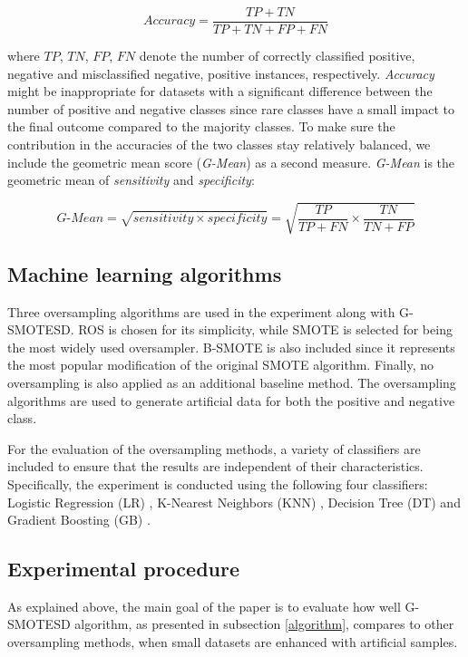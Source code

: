 \documentclass[parskip=full]{scrartcl}
\begin{document}
$$ \textit{Accuracy} = \frac{TP + TN}{TP +TN + FP + FN}$$

where \( TP \), \( TN \), \(FP \), \( FN\) denote the number of correctly classified positive, negative and misclassified negative, positive instances, respectively. \textit{Accuracy} might be inappropriate for datasets with a significant difference between the number of positive and negative classes since rare classes have a small impact to the final outcome compared to the majority classes. To make sure the contribution in the accuracies of the two classes stay relatively balanced, we include the geometric mean score (\textit{G-Mean}) as a second measure. \textit{G-Mean} is the geometric mean of \textit{sensitivity} and \textit{specificity}:

$$\textit{G-Mean} = \sqrt{sensitivity \times specificity} = \sqrt{\dfrac{TP}{TP + FN}
\times \dfrac{TN}{TN + FP}}$$

\subsection{Machine learning algorithms}

Three oversampling algorithms are used in the experiment along with G-SMOTESD. ROS is chosen for its simplicity, while SMOTE is selected for being the most widely used oversampler. B-SMOTE is also included since it represents the most popular modification of the original SMOTE algorithm. Finally, no oversampling is also applied as an additional baseline method. The oversampling algorithms are used to generate artificial data for both the positive and negative class.

For the evaluation of the oversampling methods, a variety of classifiers are included to ensure that the results are independent of their characteristics. Specifically, the experiment is conducted using the following four classifiers: Logistic Regression (LR) \cite{McCullagh.2019}, K-Nearest Neighbors (KNN) \cite{Cover.1967}, Decision Tree (DT) \cite{Salzberg.1994} and Gradient Boosting (GB) \cite{Friedman.2001}.

\subsection{Experimental procedure}
\label{experimental}

As explained above, the main goal of the paper is to evaluate how well G-SMOTESD algorithm, as presented in subsection \ref{algorithm}, compares to other oversampling methods, when small datasets are enhanced with artificial samples. 
\end{document}
